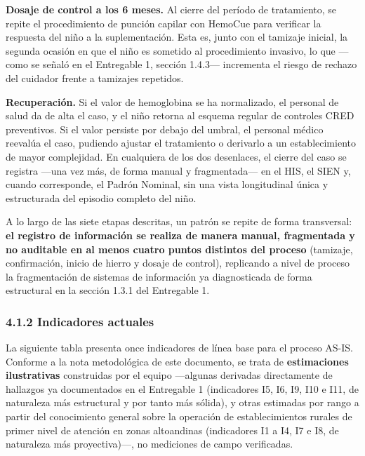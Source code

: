 \documentclass[11pt,a4paper]{article}
\begin{document}
\textbf{Dosaje de control a los 6 meses.} Al cierre del período de tratamiento, se repite el procedimiento de punción capilar con HemoCue para verificar la respuesta del niño a la suplementación. Esta es, junto con el tamizaje inicial, la segunda ocasión en que el niño es sometido al procedimiento invasivo, lo que ---como se señaló en el Entregable 1, sección 1.4.3--- incrementa el riesgo de rechazo del cuidador frente a tamizajes repetidos.

\textbf{Recuperación.} Si el valor de hemoglobina se ha normalizado, el personal de salud da de alta el caso, y el niño retorna al esquema regular de controles CRED preventivos. Si el valor persiste por debajo del umbral, el personal médico reevalúa el caso, pudiendo ajustar el tratamiento o derivarlo a un establecimiento de mayor complejidad. En cualquiera de los dos desenlaces, el cierre del caso se registra ---una vez más, de forma manual y fragmentada--- en el HIS, el SIEN y, cuando corresponde, el Padrón Nominal, sin una vista longitudinal única y estructurada del episodio completo del niño.

A lo largo de las siete etapas descritas, un patrón se repite de forma transversal: \textbf{el registro de información se realiza de manera manual, fragmentada y no auditable en al menos cuatro puntos distintos del proceso} (tamizaje, confirmación, inicio de hierro y dosaje de control), replicando a nivel de proceso la fragmentación de sistemas de información ya diagnosticada de forma estructural en la sección 1.3.1 del Entregable 1.

\subsubsection{4.1.2 Indicadores actuales}\label{indicadores-actuales}

La siguiente tabla presenta once indicadores de línea base para el proceso AS-IS. Conforme a la nota metodológica de este documento, se trata de \textbf{estimaciones ilustrativas} construidas por el equipo ---algunas derivadas directamente de hallazgos ya documentados en el Entregable 1 (indicadores I5, I6, I9, I10 e I11, de naturaleza más estructural y por tanto más sólida), y otras estimadas por rango a partir del conocimiento general sobre la operación de establecimientos rurales de primer nivel de atención en zonas altoandinas (indicadores I1 a I4, I7 e I8, de naturaleza más proyectiva)---, no mediciones de campo verificadas.
\end{document}
